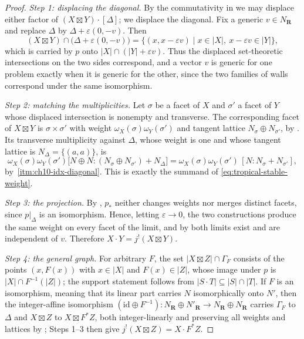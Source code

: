 \begin{proof}
\emph{Step 1: displacing the diagonal.}
By the commutativity in  we may
displace either factor of $(X\boxtimes Y)\cdot[\Delta]$; we displace the
diagonal.  Fix a generic $v\in N_{\mathbf R}$ and replace $\Delta$ by
$\Delta+\varepsilon(0,-v)$.  Then
\[
 (X\boxtimes Y)\cap\bigl(\Delta+\varepsilon(0,-v)\bigr)
 =\{(x,x-\varepsilon v)\mid x\in|X|,\ x-\varepsilon v\in|Y|\},
\]
which is carried by $p$ onto $|X|\cap(|Y|+\varepsilon v)$.  Thus the
displaced set-theoretic intersections on the two sides correspond, and a
vector $v$ is generic for one problem exactly when it is generic for the
other, since the two families of walls correspond under the same
isomorphism.

\emph{Step 2: matching the multiplicities.}
Let $\sigma$ be a facet of $X$ and $\sigma'$ a facet of $Y$ whose displaced
intersection is nonempty and transverse.  The corresponding facet of
$X\boxtimes Y$ is $\sigma\times\sigma'$ with weight
$\omega_X(\sigma)\omega_Y(\sigma')$ and tangent lattice
$N_\sigma\oplus N_{\sigma'}$, by .  Its
transverse multiplicity against $\Delta$, whose weight is one and whose
tangent lattice is $N_\Delta=\{(a,a)\}$, is
\[
 \omega_X(\sigma)\omega_Y(\sigma')
 \bigl[N\oplus N:(N_\sigma\oplus N_{\sigma'})+N_\Delta\bigr]
 =\omega_X(\sigma)\omega_Y(\sigma')\,[N:N_\sigma+N_{\sigma'}],
\]
by \,\cref{itm:ch10-idx-diagonal}.  This is exactly the
summand of \eqref{eq:tropical-stable-weight}.

\emph{Step 3: the projection.}
By , $p_*$ neither changes weights nor merges
distinct facets, since $p|_\Delta$ is an isomorphism.  Hence, letting
$\varepsilon\to0$, the two constructions produce the same weight on every
facet of the limit, and by
 both limits exist and are independent
of $v$.  Therefore $X\cdot Y=j^!(X\boxtimes Y)$.

\emph{Step 4: the general graph.}
For arbitrary $F$, the set $|X\boxtimes Z|\cap\Gamma_F$ consists of the
points $(x,F(x))$ with $x\in|X|$ and $F(x)\in|Z|$, whose image under $p$ is
$|X|\cap F^{-1}(|Z|)$; the support statement follows from
$|S\cdot T|\subseteq|S|\cap|T|$.  If $F$ is an isomorphism, meaning that its
linear part carries $N$ isomorphically onto $N'$, then the integer-affine
isomorphism
$(\mathrm{id}\oplus F^{-1}):N_{\mathbf R}\oplus N'_{\mathbf R}\to
N_{\mathbf R}\oplus N_{\mathbf R}$ carries $\Gamma_F$ to $\Delta$ and
$X\boxtimes Z$ to $X\boxtimes F^*Z$, both integer-linearly and preserving all
weights and lattices by
; Steps 1--3 then give
$j^!(X\boxtimes Z)=X\cdot F^*Z$.
\end{proof}

